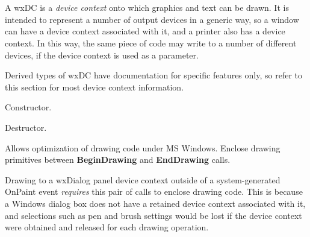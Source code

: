 \section{}\label{wxdc}

A wxDC is a {\it device context} onto which graphics and text can be drawn.
It is intended to represent a number of output devices in a generic way,
so a window can have a device context associated with it, and a printer also has a device context.
In this way, the same piece of code may write to a number of different devices,
if the device context is used as a parameter.

Derived types of wxDC have documentation for specific features
only, so refer to this section for most device context information.








Constructor.



Destructor.

\label{wxdcbegindrawing}


Allows optimization of drawing code under MS Windows. Enclose
drawing primitives between {\bf BeginDrawing} and {\bf EndDrawing}\rtfsp
calls.

Drawing to a wxDialog panel device context outside of a
system-generated OnPaint event {\it requires} this pair of calls to
enclose drawing code. This is because a Windows dialog box does not have
a retained device context associated with it, and selections such as pen
and brush settings would be lost if the device context were obtained and
released for each drawing operation.

\label{wxdcblit}


